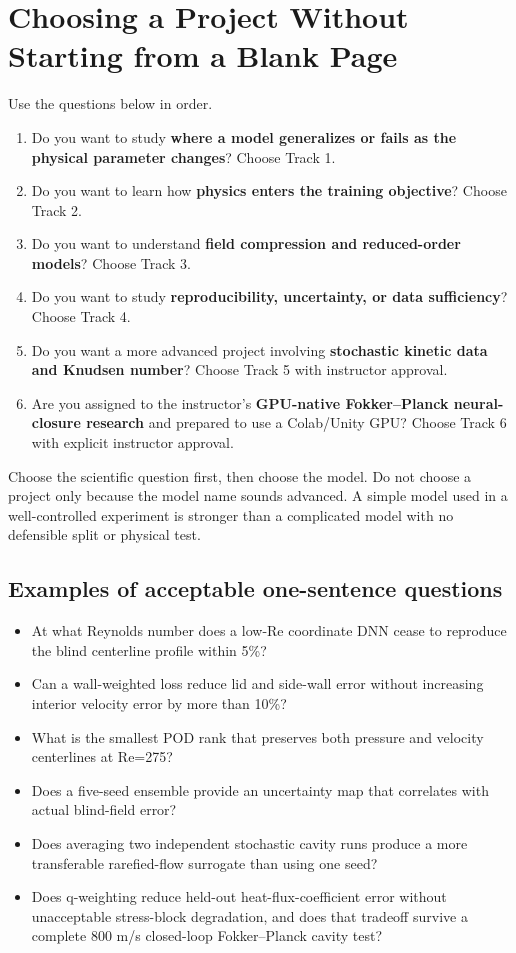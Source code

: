 \documentclass[11pt]{article}
\begin{document}
\section{Choosing a Project Without Starting from a Blank Page}
Use the questions below in order.

\begin{enumerate}
\item Do you want to study \textbf{where a model generalizes or fails as the physical parameter changes}? Choose Track 1.
\item Do you want to learn how \textbf{physics enters the training objective}? Choose Track 2.
\item Do you want to understand \textbf{field compression and reduced-order models}? Choose Track 3.
\item Do you want to study \textbf{reproducibility, uncertainty, or data sufficiency}? Choose Track 4.
\item Do you want a more advanced project involving \textbf{stochastic kinetic data and Knudsen number}? Choose Track 5 with instructor approval.
\item Are you assigned to the instructor's \textbf{GPU-native Fokker--Planck neural-closure research} and prepared to use a Colab/Unity GPU? Choose Track 6 with explicit instructor approval.
\end{enumerate}

\begin{warningbox}
Choose the scientific question first, then choose the model. Do not choose a project only because the model name sounds advanced. A simple model used in a well-controlled experiment is stronger than a complicated model with no defensible split or physical test.
\end{warningbox}

\subsection{Examples of acceptable one-sentence questions}
\begin{itemize}
\item At what Reynolds number does a low-Re coordinate DNN cease to reproduce the blind centerline profile within 5\%?
\item Can a wall-weighted loss reduce lid and side-wall error without increasing interior velocity error by more than 10\%?
\item What is the smallest POD rank that preserves both pressure and velocity centerlines at Re=275?
\item Does a five-seed ensemble provide an uncertainty map that correlates with actual blind-field error?
\item Does averaging two independent stochastic cavity runs produce a more transferable rarefied-flow surrogate than using one seed?
\item Does q-weighting reduce held-out heat-flux-coefficient error without unacceptable stress-block degradation, and does that tradeoff survive a complete 800 m/s closed-loop Fokker--Planck cavity test?
\end{itemize}
\end{document}
